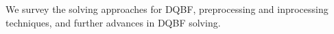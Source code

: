 We survey the solving approaches for DQBF, preprocessing and inprocessing techniques,
and further advances in DQBF solving.

